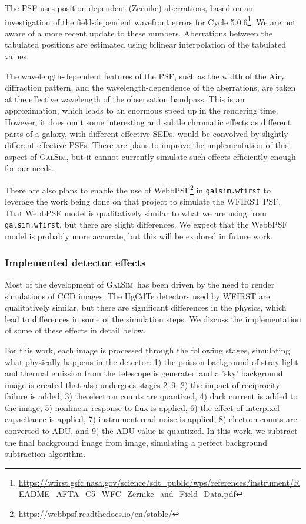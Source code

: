\documentclass[aps,prd, amsmath,amssymb,superscriptaddress,showkeys,nofootinbib,reprint,preprintnumbers]{revtex4-1}
\newcommand{\galsim}{\textsc{GalSim}}
\begin{document}
The PSF uses position-dependent (Zernike) aberrations, based on an investigation of the field-dependent wavefront errors for Cycle 5.0.6\footnote{\url{https://wfirst.gsfc.nasa.gov/science/sdt_public/wps/references/instrument/README_AFTA_C5_WFC_Zernike_and_Field_Data.pdf}}.
We are not aware of a more recent update to these numbers. 
Aberrations between the tabulated positions are estimated using bilinear interpolation of the tabulated values.

The wavelength-dependent features of the PSF, such as the width of the Airy diffraction pattern, and the wavelength-dependence of the aberrations, are taken at the effective wavelength of the observation bandpass.
This is an approximation, which leads to an enormous speed up in the rendering time.
However, it does omit some interesting and subtle chromatic effects as different parts of a galaxy, with different effective SEDs, would be convolved by slightly different effective PSFs.
There are plans to improve the implementation of this aspect of \galsim, but it cannot currently simulate such effects efficiently enough for our needs.

There are also plans to enable the use of WebbPSF\footnote{\url{https://webbpsf.readthedocs.io/en/stable/}} in \texttt{galsim.wfirst} to leverage the work being done on that project to simulate the WFIRST PSF.
That WebbPSF model is qualitatively similar to what we are using from \texttt{galsim.wfirst}, but there are slight differences.
We expect that the WebbPSF model is probably more accurate, but this will be explored in future work.

\subsubsection{Implemented detector effects}\label{effects}

Most of the development of \galsim\ has been driven by the need to render simulations of CCD images.
The HgCdTe detectors used by WFIRST are qualitatively similar, but there are significant differences in the physics, which lead to differences in some of the simulation steps. We discuss the implementation of some of these effects in detail below. 

For this work, each image is processed through the following stages, simulating what physically happens in the detector: 1) the poisson background of stray light and thermal emission from the telescope is generated and a 'sky' background image is created that also undergoes stages 2--9, 2) the impact of reciprocity failure is added, 3) the electron counts are quantized, 4) dark current is added to the image, 5) nonlinear response to flux is applied, 6) the effect of interpixel capacitance is applied, 7) instrument read noise is applied, 8) electron counts are converted to ADU, and 9) the ADU value is quantized. In this work, we subtract the final background image from image, simulating a perfect background subtraction algorithm.
\end{document}
